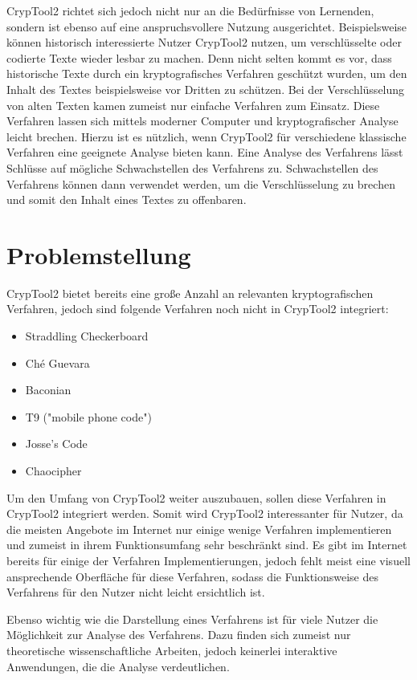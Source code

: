 \documentclass[fontsize=11pt, paper=a4, parskip=half]{scrartcl}
\begin{document}
CrypTool2 richtet sich jedoch nicht nur an die Bedürfnisse von Lernenden, sondern ist ebenso auf eine anspruchsvollere Nutzung ausgerichtet. Beispielsweise können historisch interessierte Nutzer CrypTool2 nutzen, um verschlüsselte oder codierte Texte wieder lesbar zu machen. Denn nicht selten kommt es vor, dass historische Texte durch ein kryptografisches Verfahren geschützt wurden, um den Inhalt des Textes beispielsweise vor Dritten zu schützen. Bei der Verschlüsselung von alten Texten kamen zumeist nur einfache Verfahren zum Einsatz. Diese Verfahren lassen sich mittels moderner Computer und kryptografischer Analyse leicht brechen. Hierzu ist es nützlich, wenn CrypTool2 für verschiedene klassische Verfahren eine geeignete Analyse bieten kann. Eine Analyse des Verfahrens lässt Schlüsse auf mögliche Schwachstellen des Verfahrens zu. Schwachstellen des Verfahrens können dann verwendet werden, um die Verschlüsselung zu brechen und somit den Inhalt eines Textes zu offenbaren.

\section{Problemstellung}
CrypTool2 bietet bereits eine große Anzahl an relevanten kryptografischen Verfahren, jedoch sind folgende Verfahren noch nicht in CrypTool2 integriert:
\begin{itemize}
	\item{Straddling Checkerboard} 
	\item{Ché Guevara}
	\item{Baconian} 
	\item{T9 ("mobile phone code")}
	\item{Josse's Code}
	\item{Chaocipher} 
\end{itemize}

Um den Umfang von CrypTool2 weiter auszubauen, sollen diese Verfahren in CrypTool2 integriert werden. Somit wird CrypTool2 interessanter für Nutzer, da die meisten Angebote im Internet nur einige wenige Verfahren implementieren und zumeist in ihrem Funktionsumfang sehr beschränkt sind. Es gibt im Internet bereits für einige der Verfahren Implementierungen, jedoch fehlt meist eine visuell ansprechende Oberfläche für diese Verfahren, sodass die Funktionsweise des Verfahrens für den Nutzer nicht leicht ersichtlich ist.

Ebenso wichtig wie die Darstellung eines Verfahrens ist für viele Nutzer die Möglichkeit zur Analyse des Verfahrens. Dazu finden sich zumeist nur theoretische wissenschaftliche Arbeiten, jedoch keinerlei interaktive Anwendungen, die die Analyse verdeutlichen.
\end{document}
